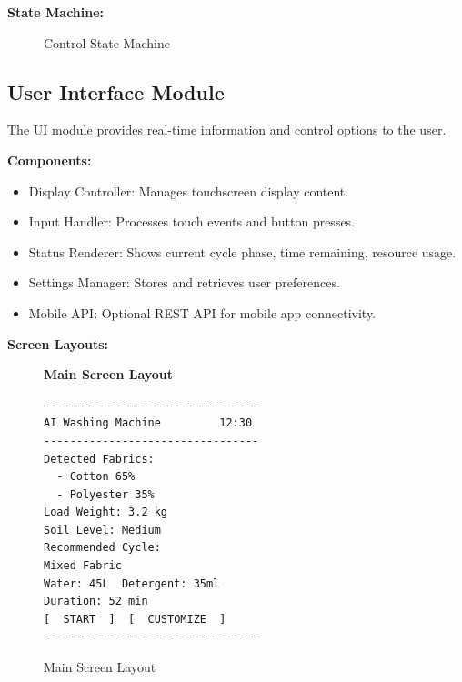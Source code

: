 \textbf{State Machine:}

\begin{figure}[H]
\centering
{}
\caption{Control State Machine}
\label{fig:state}
\end{figure}

\subsection{User Interface Module}

The UI module provides real-time information and control options to the user.

\textbf{Components:}
\begin{itemize}
    \item Display Controller: Manages touchscreen display content.
    \item Input Handler: Processes touch events and button presses.
    \item Status Renderer: Shows current cycle phase, time remaining, resource usage.
    \item Settings Manager: Stores and retrieves user preferences.
    \item Mobile API: Optional REST API for mobile app connectivity.
\end{itemize}

\textbf{Screen Layouts:}

\begin{figure}[H]
\centering
\begin{minipage}{0.6\textwidth}
\centering
\textbf{Main Screen Layout}
\begin{lstlisting}[basicstyle=\ttfamily\small, breaklines=true]
---------------------------------
AI Washing Machine         12:30
---------------------------------
Detected Fabrics:
  - Cotton 65%
  - Polyester 35%
Load Weight: 3.2 kg
Soil Level: Medium
Recommended Cycle:
Mixed Fabric
Water: 45L  Detergent: 35ml
Duration: 52 min
[  START  ]  [  CUSTOMIZE  ]
---------------------------------
\end{lstlisting}
\end{minipage}
\caption{Main Screen Layout}
\label{fig:ui}
\end{figure}

